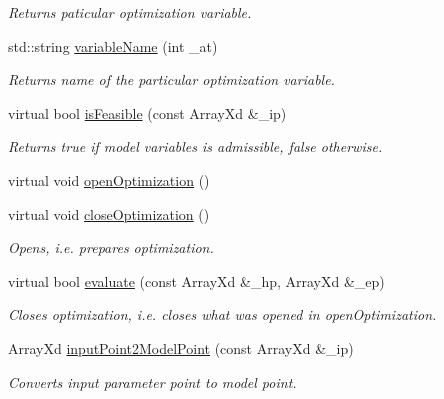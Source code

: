 \begin{DoxyCompactItemize}
\begin{DoxyCompactList}\small\item\em Returns paticular optimization variable. \end{DoxyCompactList}\item 
std\-::string \hyperlink{class_go_s_u_m_1_1_c_simple_optimization_problem_ac044232f2c68d23b4791fbcf6dffcc81}{variable\-Name} (int \-\_\-at)
\begin{DoxyCompactList}\small\item\em Returns name of the particular optimization variable. \end{DoxyCompactList}\item 
virtual bool \hyperlink{class_go_s_u_m_1_1_c_simple_optimization_problem_aa66a0dd530b4cab400fc88b32f566298}{is\-Feasible} (const Array\-Xd \&\-\_\-ip)
\begin{DoxyCompactList}\small\item\em Returns true if model variables is admissible, false otherwise. \end{DoxyCompactList}\item 
virtual void \hyperlink{class_go_s_u_m_1_1_c_simple_optimization_problem_a772db1ec2c35c78a4b68551969e4083c}{open\-Optimization} ()
\item 
virtual void \hyperlink{class_go_s_u_m_1_1_c_simple_optimization_problem_af34b88f099f94727611b79d5f5ca4e9a}{close\-Optimization} ()
\begin{DoxyCompactList}\small\item\em Opens, i.\-e. prepares optimization. \end{DoxyCompactList}\item 
virtual bool \hyperlink{class_go_s_u_m_1_1_c_simple_optimization_problem_aa746b5adb39e80712ecddf18e466f4ab}{evaluate} (const Array\-Xd \&\-\_\-hp, Array\-Xd \&\-\_\-ep)
\begin{DoxyCompactList}\small\item\em Closes optimization, i.\-e. closes what was opened in open\-Optimization. \end{DoxyCompactList}\item 
Array\-Xd \hyperlink{class_go_s_u_m_1_1_c_simple_optimization_problem_a1eb9802fcaf98b032e0ad2f5c70541ce}{input\-Point2\-Model\-Point} (const Array\-Xd \&\-\_\-ip)
\begin{DoxyCompactList}\small\item\em Converts input parameter point to model point. \end{DoxyCompactList}\end{DoxyCompactItemize}
